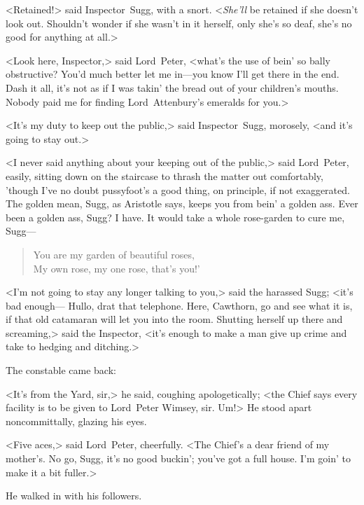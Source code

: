 <Retained!> said Inspector~Sugg, with a snort. <\textit{She'll} be retained if she doesn't look out. Shouldn't wonder if she wasn't in it herself, only she's so deaf, she's no good for anything at all.>

<Look here, Inspector,> said Lord~Peter, <what's the use of bein' so bally obstructive? You'd much better let me in—you know I'll get there in the end. Dash it all, it's not as if I was takin' the bread out of your children's mouths. Nobody paid me for finding Lord~Attenbury's emeralds for you.>

<It's my duty to keep out the public,> said Inspector~Sugg, morosely, <and it's going to stay out.>

<I never said anything about your keeping out of the public,> said Lord~Peter, easily, sitting down on the staircase to thrash the matter out comfortably, 'though I've no doubt pussyfoot's a good thing, on principle, if not exaggerated. The golden mean, Sugg, as Aristotle says, keeps you from bein' a golden ass. Ever been a golden ass, Sugg? I have. It would take a whole rose-garden to cure me, Sugg—

\begin{verse}
You are my garden of beautiful roses,\\
My own rose, my one rose, that's you!'
\end{verse}

<I'm not going to stay any longer talking to you,> said the harassed Sugg; <it's bad enough— Hullo, drat that telephone. Here, Cawthorn, go and see what it is, if that old catamaran will let you into the room. Shutting herself up there and screaming,> said the Inspector, <it's enough to make a man give up crime and take to hedging and ditching.>

The constable came back:

<It's from the Yard, sir,> he said, coughing apologetically; <the Chief says every facility is to be given to Lord~Peter Wimsey, sir. Um!> He stood apart noncommittally, glazing his eyes.

<Five aces,> said Lord~Peter, cheerfully. <The Chief's a dear friend of my mother's. No go, Sugg, it's no good buckin'; you've got a full house. I'm goin' to make it a bit fuller.>

He walked in with his followers.

